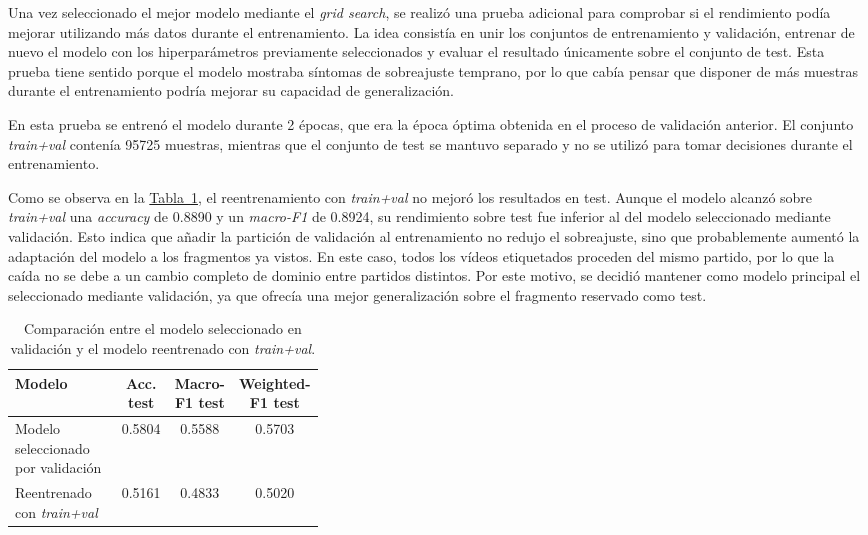 Una vez seleccionado el mejor modelo mediante el \textit{grid search}, se realizó una prueba adicional para comprobar si el rendimiento podía mejorar utilizando más datos durante el entrenamiento. La idea consistía en unir los conjuntos de entrenamiento y validación, entrenar de nuevo el modelo con los hiperparámetros previamente seleccionados y evaluar el resultado únicamente sobre el conjunto de test. Esta prueba tiene sentido porque el modelo mostraba síntomas de sobreajuste temprano, por lo que cabía pensar que disponer de más muestras durante el entrenamiento podría mejorar su capacidad de generalización.

En esta prueba se entrenó el modelo durante 2 épocas, que era la época óptima obtenida en el proceso de validación anterior. El conjunto \textit{train+val} contenía 95725 muestras, mientras que el conjunto de test se mantuvo separado y no se utilizó para tomar decisiones durante el entrenamiento.

Como se observa en la \hyperref[tab:comparacion_train_val_posiciones]{Tabla~\ref*{tab:comparacion_train_val_posiciones}}, el reentrenamiento con \textit{train+val} no mejoró los resultados en test. Aunque el modelo alcanzó sobre \textit{train+val} una \textit{accuracy} de 0.8890 y un \textit{macro-F1} de 0.8924, su rendimiento sobre test fue inferior al del modelo seleccionado mediante validación. Esto indica que añadir la partición de validación al entrenamiento no redujo el sobreajuste, sino que probablemente aumentó la adaptación del modelo a los fragmentos ya vistos. En este caso, todos los vídeos etiquetados proceden del mismo partido, por lo que la caída no se debe a un cambio completo de dominio entre partidos distintos. Por este motivo, se decidió mantener como modelo principal el seleccionado mediante validación, ya que ofrecía una mejor generalización sobre el fragmento reservado como test.

\begin{table}[H]
    \centering
    \scriptsize
    \begin{tabular}{p{0.36\linewidth}|c|c|c}
        \textbf{Modelo} & \textbf{Acc. test} & \textbf{Macro-F1 test} & \textbf{Weighted-F1 test} \\
        \hline\hline
        Modelo seleccionado por validación & 0.5804 & 0.5588 & 0.5703 \\
        \hline
        Reentrenado con \textit{train+val} & 0.5161 & 0.4833 & 0.5020 \\
        \hline
    \end{tabular}
    \caption[Comparación de estrategias de entrenamiento]{Comparación entre el modelo seleccionado en validación y el modelo reentrenado con \textit{train+val}.}
    \label{tab:comparacion_train_val_posiciones}
\end{table}



